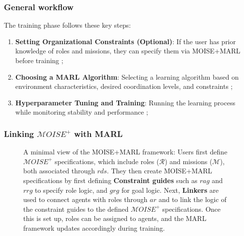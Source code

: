 \documentclass[pdflatex,sn-mathphys-num]{sn-jnl}%
\theoremstyle{thmstyleone}%
\theoremstyle{thmstyletwo}%
\theoremstyle{thmstylethree}%
\begin{document}
\subsubsection{General workflow}
The training phase follows these key steps:
\begin{enumerate}
    \item \textbf{Setting Organizational Constraints (Optional)}: If the user has prior knowledge of roles and missions, they can specify them via MOISE+MARL before training ;
    \item \textbf{Choosing a MARL Algorithm}: Selecting a learning algorithm based on environment characteristics, desired coordination levels, and constraints ;
    \item \textbf{Hyperparameter Tuning and Training}: Running the learning process while monitoring stability and performance ;
\end{enumerate}

\subsubsection{Linking $\mathcal{M}OISE^+$ with MARL}
\begin{figure}[h!]
    \centering
    
    \caption{A minimal view of the MOISE+MARL framework:
        Users first define $\mathcal{M}OISE^+$ specifications, which include roles ($\mathcal{R}$) and missions ($\mathcal{M}$), both associated through $rds$. They then create MOISE+MARL specifications by first defining \textbf{Constraint guides} such as $rag$ and $rrg$ to specify role logic, and $grg$ for goal logic. 
        Next, \textbf{Linkers} are used to connect agents with roles through $ar$ and to link the logic of the constraint guides to the defined $\mathcal{M}OISE^+$ specifications. Once this is set up, roles can be assigned to agents, and the MARL framework updates accordingly during training.
    }
    \label{fig:mm_synthesis}
\end{figure}
\end{document}
